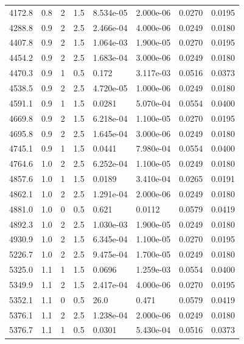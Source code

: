 \documentclass[preview]{standalone}
\begin{document}
{{{\begin{tabular}{L{1.2cm}C{1.2cm} C{0.3cm}C{0.5cm} C{1.4cm}C{1.4cm} C{1.4cm}C{1.4cm}}
  4172.8  &   0.8  & 2     & 1.5 &  8.534e-05  & 2.000e-06  & 0.0270 &  0.0195   \\ 
  4288.8  &   0.9  & 2     & 2.5 &  2.466e-04  & 4.000e-06  & 0.0249 &  0.0180   \\ 
  4407.8  &   0.9  & 2     & 1.5 &  1.064e-03  & 1.900e-05  & 0.0270 &  0.0195   \\ 
  4454.2  &   0.9  & 2     & 2.5 &  1.683e-04  & 3.000e-06  & 0.0249 &  0.0180   \\ 
  4470.3  &   0.9  & 1     & 0.5 &  0.172  & 3.117e-03  & 0.0516 &  0.0373   \\ 
  4538.5  &   0.9  & 2     & 2.5 &  4.720e-05  & 1.000e-06  & 0.0249 &  0.0180   \\ 
  4591.1  &   0.9  & 1     & 1.5 &  0.0281  & 5.070e-04  & 0.0554 &  0.0400   \\ 
  4669.8  &   0.9  & 2     & 1.5 &  6.218e-04  & 1.100e-05  & 0.0270 &  0.0195   \\ 
  4695.8  &   0.9  & 2     & 2.5 &  1.645e-04  & 3.000e-06  & 0.0249 &  0.0180   \\ 
  4745.1  &   0.9  & 1     & 1.5 &  0.0441  & 7.980e-04  & 0.0554 &  0.0400   \\ 
  4764.6  &   1.0  & 2     & 2.5 &  6.252e-04  & 1.100e-05  & 0.0249 &  0.0180   \\ 
  4857.6  &   1.0  & 1     & 1.5 &  0.0189  & 3.410e-04  & 0.0265 &  0.0191   \\ 
  4862.1  &   1.0  & 2     & 2.5 &  1.291e-04  & 2.000e-06  & 0.0249 &  0.0180   \\ 
  4881.0  &   1.0  & 0     & 0.5 &  0.621  & 0.0112  & 0.0579 &  0.0419   \\ 
  4892.3  &   1.0  & 2     & 2.5 &  1.030e-03  & 1.900e-05  & 0.0249 &  0.0180   \\ 
  4930.9  &   1.0  & 2     & 1.5 &  6.345e-04  & 1.100e-05  & 0.0270 &  0.0195   \\ 
  5226.7  &   1.0  & 2     & 2.5 &  9.475e-04  & 1.700e-05  & 0.0249 &  0.0180   \\ 
  5325.0  &   1.1  & 1     & 1.5 &  0.0696  & 1.259e-03  & 0.0554 &  0.0400   \\ 
  5349.9  &   1.1  & 2     & 1.5 &  2.417e-04  & 4.000e-06  & 0.0270 &  0.0195   \\ 
  5352.1  &   1.1  & 0     & 0.5 &  26.0  & 0.471  & 0.0579 &  0.0419   \\ 
  5376.1  &   1.1  & 2     & 2.5 &  1.238e-04  & 2.000e-06  & 0.0249 &  0.0180   \\ 
  5376.7  &   1.1  & 1     & 0.5 &  0.0301  & 5.430e-04  & 0.0516 &  0.0373   \\ 

\end{tabular}}}}
\end{document}
